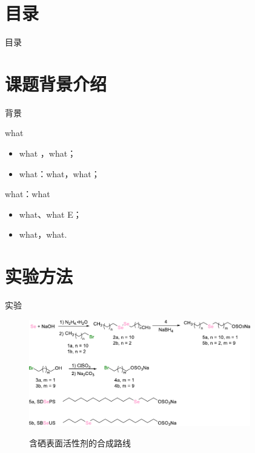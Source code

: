 \documentclass[10pt,aspectratio=43,mathserif]{beamer}
\title[含硒表面活性剂囊泡的构筑与性质研究]{\fontsize{13pt}{18pt}\selectfont {含硒表面活性剂囊泡的构筑与性质研究}}
\subtitle{\fontsize{9pt}{14pt}\selectfont \textbf{毕业论文答辩}}
\author[陈育明 (应用化学1502班)]{\makebox[4em][s]{答辩人}：陈育明\\\medskip
指导教师：刘雪锋
}
\institute[SCME]{
  化学与材料工程学院\\
  江南大学}
\date[2019年6月9日]{
 2019年6月9日}
\begin{document}
\begin{frame}
\titlepage
\end{frame}				%

\section*{目录}
    \begin{frame}{目录}
        \tableofcontents
    \end{frame}

\section[介绍]{课题背景介绍}

    \begin{frame}{背景}
    \begin{block}{what}
        \begin{itemize}
        \item what ，what；
        \item what：what，what；
        \end{itemize}
    \end{block}
    \begin{block}{what：what\footnotemark[1]}
        \begin{itemize}
        \item what、what E；
        \item what，what. 
        \end{itemize}
    \end{block}
    \end{frame}

\section[实验]{实验方法}

 \begin{frame}{实验}
    \begin{figure}[htbp]
    \centering
    \includegraphics[width=0.86\textwidth]{figure/scheme-synthesis.pdf}\\
    \caption{含硒表面活性剂的合成路线}\label{fig:synthesis}
\end{figure}
\end{frame}
\end{document}
